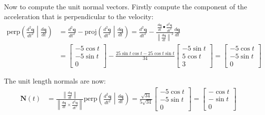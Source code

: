 \documentclass{article}
\begin{document}
Now to compute the unit normal vectors. Firstly compute the component of the acceleration that is perpendicular to the velocity: 
\begin{align*}
\text{perp}\left(\frac{d^2 \mathbf{q}}{dt^2}\middle|\frac{d\mathbf{q}}{dt}\right) 
& = \frac{d^2 \mathbf{q}}{dt^2} - \text{proj}\left(\frac{d^2 \mathbf{q}}{dt^2}\middle|\frac{d\mathbf{q}}{dt}\right) 
= \frac{d^2 \mathbf{q}}{dt^2} - \frac{\frac{d\mathbf{q}}{dt} \bullet \frac{d^2 \mathbf{q}}{dt^2}}{\left\|\frac{d\mathbf{q}}{dt}\right\|^2}\frac{d\mathbf{q}}{dt} \\
& = \begin{bmatrix} -5 \cos t \\ -5 \sin t \\ 0 \end{bmatrix} - \frac{25\sin t \cos t - 25\cos t \sin t}{34}\begin{bmatrix} 
-5 \sin t \\  
5 \cos t \\ 
3 
\end{bmatrix}
= \begin{bmatrix} -5 \cos t \\ -5 \sin t \\ 0 \end{bmatrix}
\end{align*}

The unit length normals are now:
\begin{align*}
\mathbf{N}(t) 
& = \frac{\left\|\frac{d\mathbf{q}}{dt}\right\|}{\left\|\frac{d\mathbf{q}}{dt} \times \frac{d^2 \mathbf{q}}{dt^2}\right\|}\text{perp}\left(\frac{d^2 \mathbf{q}}{dt^2}\middle|\frac{d\mathbf{q}}{dt}\right) 
= \frac{\sqrt{34}}{5\sqrt{34}}\begin{bmatrix} -5 \cos t \\ -5 \sin t \\ 0 \end{bmatrix}
= \begin{bmatrix} -\cos t \\ -\sin t \\ 0 \end{bmatrix}
\end{align*}
\end{document}
